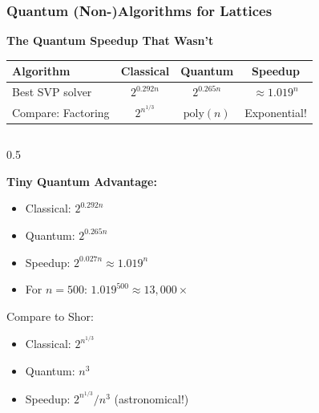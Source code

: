 \documentclass[aspectratio=169,10pt]{beamer}
\newcommand{\slideheader}[1]{\frametitle{#1}}
\theoremstyle{plain}
\begin{document}
\begin{frame}
  \slideheader{Quantum (Non-)Algorithms for Lattices}
  
  \begin{center}
    \textbf{\large The Quantum Speedup That Wasn't}
  \end{center}
  
  \vspace{0.5cm}
  
  \begin{table}
    \centering
    \begin{tabular}{|l|c|c|c|}
      \hline
      \textbf{Algorithm} & \textbf{Classical} & \textbf{Quantum} & \textbf{Speedup} \\
      \hline
      Best SVP solver & $2^{0.292n}$ & $2^{0.265n}$ & $\approx 1.019^n$ \\
      \hline
      Compare: Factoring & $2^{n^{1/3}}$ & $\text{poly}(n)$ & Exponential! \\
      \hline
    \end{tabular}
  \end{table}
  
  \vspace{0.5cm}
  
  \begin{columns}[T]
    \begin{column}{0.5\textwidth}

    \begin{redBox}
      \textbf{Tiny Quantum Advantage:}
      \begin{itemize}
        \item Classical: $2^{0.292n}$
        \item Quantum: $2^{0.265n}$
        \item Speedup: $2^{0.027n} \approx 1.019^n$
        \item For $n=500$: $1.019^{500} \approx 13,000\times$
      \end{itemize}
    \end{redBox}
    
    \vspace{0.3cm}
    
    Compare to Shor:
    \begin{itemize}
      \item Classical: $2^{n^{1/3}}$
      \item Quantum: $n^3$
      \item Speedup: $2^{n^{1/3}}/n^3$ (astronomical!)
    \end{itemize}
  

\end{column}
\end{columns}
\end{frame}
\end{document}
